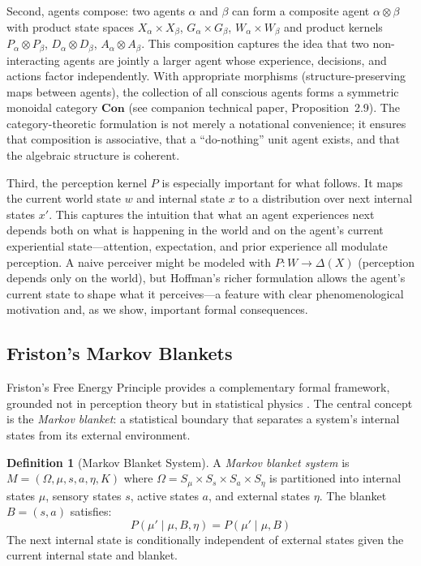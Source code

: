 \documentclass[11pt,a4paper]{article}
\theoremstyle{definition}
\newtheorem{definition}{Definition}[section]
\theoremstyle{plain}
\theoremstyle{remark}
\newcommand{\Con}{\mathbf{Con}}
\begin{document}
Second, agents compose: two agents $\alpha$ and $\beta$ can form a composite agent $\alpha \otimes \beta$ with product state spaces $X_\alpha \times X_\beta$, $G_\alpha \times G_\beta$, $W_\alpha \times W_\beta$ and product kernels $P_\alpha \otimes P_\beta$, $D_\alpha \otimes D_\beta$, $A_\alpha \otimes A_\beta$. This composition captures the idea that two non-interacting agents are jointly a larger agent whose experience, decisions, and actions factor independently. With appropriate morphisms (structure-preserving maps between agents), the collection of all conscious agents forms a symmetric monoidal category $\Con$ (see companion technical paper, Proposition~2.9). The category-theoretic formulation is not merely a notational convenience; it ensures that composition is associative, that a ``do-nothing'' unit agent exists, and that the algebraic structure is coherent.

Third, the perception kernel $P$ is especially important for what follows. It maps the current world state $w$ and internal state $x$ to a distribution over next internal states $x'$. This captures the intuition that what an agent experiences next depends both on what is happening in the world and on the agent's current experiential state---attention, expectation, and prior experience all modulate perception. A naive perceiver might be modeled with $P: W \to \Delta(X)$ (perception depends only on the world), but Hoffman's richer formulation allows the agent's current state to shape what it perceives---a feature with clear phenomenological motivation and, as we show, important formal consequences.

\subsection{Friston's Markov Blankets}\label{sec:friston}

Friston's Free Energy Principle provides a complementary formal framework, grounded not in perception theory but in statistical physics \citep{Friston2010,Friston2019}. The central concept is the \textit{Markov blanket}: a statistical boundary that separates a system's internal states from its external environment.

\begin{definition}[Markov Blanket System]
A \emph{Markov blanket system} is $M = (\Omega, \mu, s, a, \eta, K)$ where $\Omega = S_\mu \times S_s \times S_a \times S_\eta$ is partitioned into internal states $\mu$, sensory states $s$, active states $a$, and external states $\eta$. The blanket $B = (s, a)$ satisfies:
$$P(\mu' \mid \mu, B, \eta) = P(\mu' \mid \mu, B)$$
The next internal state is conditionally independent of external states given the current internal state and blanket.
\end{definition}
\end{document}
